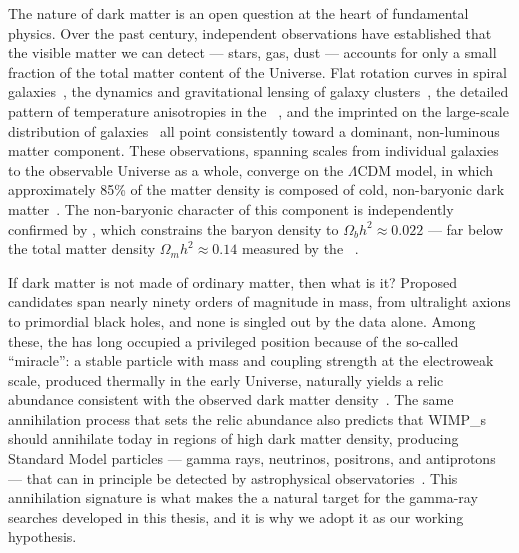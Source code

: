 
The nature of dark matter is an open question at the heart of fundamental physics.
Over the past century, independent observations have established that the visible matter we can detect --- stars, gas, dust --- accounts for only a small fraction of the total matter content of the Universe.
Flat rotation curves in spiral galaxies~\cite{Rubin:1970zza,Persic:1995ru}, the dynamics and gravitational lensing of galaxy clusters~\cite{Clowe:2006eq}, the detailed pattern of temperature anisotropies in the \CMB~\cite{Aghanim:2018eyx}, and the \BAO imprinted on the large-scale distribution of galaxies~\cite{SDSS:2005xqv} all point consistently toward a dominant, non-luminous matter component.
These observations, spanning scales from individual galaxies to the observable Universe as a whole, converge on the $\Lambda$CDM model, in which approximately 85\% of the matter density is composed of cold, non-baryonic dark matter~\cite{Aghanim:2018eyx}.
The non-baryonic character of this component is independently confirmed by \BBN, which constrains the baryon density to $\Omega_b h^2 \approx 0.022$ --- far below the total matter density $\Omega_m h^2 \approx 0.14$ measured by the \CMB~\cite{Cirelli:2024ssz}.

If dark matter is not made of ordinary matter, then what is it?
Proposed candidates span nearly ninety orders of magnitude in mass, from ultralight axions to primordial black holes, and none is singled out by the data alone.
Among these, the \WIMP has long occupied a privileged position because of the so-called ``\WIMP miracle'': a stable particle with mass and coupling strength at the electroweak scale, produced thermally in the early Universe, naturally yields a relic abundance consistent with the observed dark matter density~\cite{Cirelli:2024ssz,Steigman:2012nb}.
The same annihilation process that sets the relic abundance also predicts that \glspl{WIMP_} should annihilate today in regions of high dark matter density, producing Standard Model particles --- gamma rays, neutrinos, positrons, and antiprotons --- that can in principle be detected by astrophysical observatories~\cite{Bergstrom:1997fj}.
This annihilation signature is what makes the \WIMP a natural target for the gamma-ray searches developed in this thesis, and it is why we adopt it as our working hypothesis.

